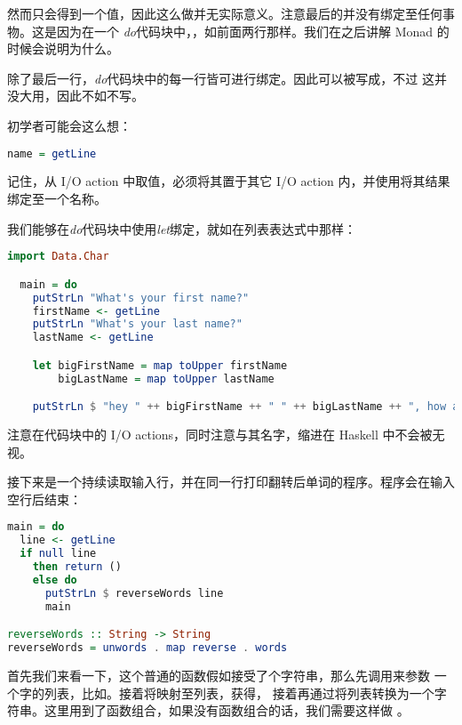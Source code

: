 \documentclass[./main.tex]{subfiles}
\begin{document}
然而只会得到一个\acode{()}值，因此这么做并无实际意义。注意最后的并没有绑定至任何事物。这是因为在一个
\textit{do}代码块中，，如前面两行那样。我们在之后讲解 Monad 的时候会说明为什么。

除了最后一行，\textit{do}代码块中的每一行皆可进行绑定。因此可以被写成，不过
这并没大用，因此不如不写。

初学者可能会这么想：

\begin{lstlisting}[language=Haskell]
  name = getLine
\end{lstlisting}

记住，从 I/O action 中取值，必须将其置于其它 I/O action 内，并使用\acode{<-}将其结果绑定至一个名称。

我们能够在\textit{do}代码块中使用\textit{let}绑定，就如在列表表达式中那样：

\begin{lstlisting}[language=Haskell]
  import Data.Char

  main = do
    putStrLn "What's your first name?"
    firstName <- getLine
    putStrLn "What's your last name?"
    lastName <- getLine

    let bigFirstName = map toUpper firstName
        bigLastName = map toUpper lastName

    putStrLn $ "hey " ++ bigFirstName ++ " " ++ bigLastName ++ ", how are you?"
\end{lstlisting}

注意在代码块中的 I/O actions，同时注意与其名字，缩进在 Haskell 中不会被无视。

接下来是一个持续读取输入行，并在同一行打印翻转后单词的程序。程序会在输入空行后结束：

\begin{lstlisting}[language=Haskell]
  main = do
  line <- getLine
  if null line
    then return ()
    else do
      putStrLn $ reverseWords line
      main

reverseWords :: String -> String
reverseWords = unwords . map reverse . words
\end{lstlisting}

首先我们来看一下，这个普通的函数假如接受了个字符串，那么先调用来参数
一个字的列表，比如。接着将映射至列表，获得，
接着再通过将列表转换为一个字符串。这里用到了函数组合，如果没有函数组合的话，我们需要这样做
。
\end{document}
